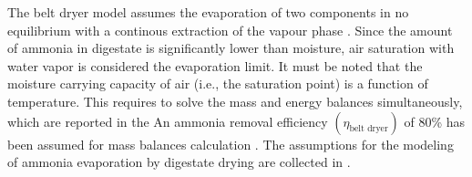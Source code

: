 \begin{refsection}[referencesCh6]
The belt dryer model assumes the evaporation of two components in no equilibrium with a continous extraction of the vapour phase \citep{treybal1980mass}.
Since the amount of ammonia in digestate is significantly lower than moisture, air saturation with water vapor is considered the evaporation limit. It must be noted that the moisture carrying capacity of air (i.e., the saturation point) is a function of temperature. This requires to solve the mass and energy balances simultaneously, which are reported in the {}
An ammonia removal efficiency $\left(\eta_{\text{belt dryer}}\right)$ of 80\% has been assumed for mass balances calculation
\citep{awiszus2018ammonia}.
The assumptions for the modeling of ammonia evaporation by digestate drying are collected in {}.


\end{refsection}
